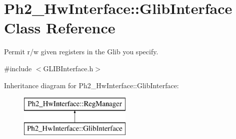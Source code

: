 \hypertarget{class_ph2___hw_interface_1_1_glib_interface}{\section{Ph2\-\_\-\-Hw\-Interface\-:\-:Glib\-Interface Class Reference}
\label{class_ph2___hw_interface_1_1_glib_interface}
}


Permit r/w given registers in the Glib you specify.  




{\ttfamily \#include $<$G\-L\-I\-B\-Interface.\-h$>$}

Inheritance diagram for Ph2\-\_\-\-Hw\-Interface\-:\-:Glib\-Interface\-:\begin{figure}[H]
\begin{center}
\leavevmode
\includegraphics[height=2.000000cm]{class_ph2___hw_interface_1_1_glib_interface}
\end{center}
\end{figure}
